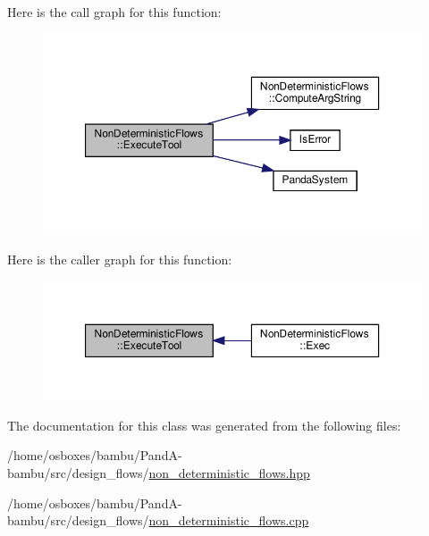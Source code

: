 Here is the call graph for this function\+:
\nopagebreak
\begin{figure}[H]
\begin{center}
\leavevmode
\includegraphics[width=350pt]{dd/d17/classNonDeterministicFlows_a80510e30acc813ada57a66815e01202c_cgraph}
\end{center}
\end{figure}
Here is the caller graph for this function\+:
\nopagebreak
\begin{figure}[H]
\begin{center}
\leavevmode
\includegraphics[width=350pt]{dd/d17/classNonDeterministicFlows_a80510e30acc813ada57a66815e01202c_icgraph}
\end{center}
\end{figure}


The documentation for this class was generated from the following files\+:\begin{DoxyCompactItemize}
\item 
/home/osboxes/bambu/\+Pand\+A-\/bambu/src/design\+\_\+flows/\hyperlink{non__deterministic__flows_8hpp}{non\+\_\+deterministic\+\_\+flows.\+hpp}\item 
/home/osboxes/bambu/\+Pand\+A-\/bambu/src/design\+\_\+flows/\hyperlink{non__deterministic__flows_8cpp}{non\+\_\+deterministic\+\_\+flows.\+cpp}\end{DoxyCompactItemize}
